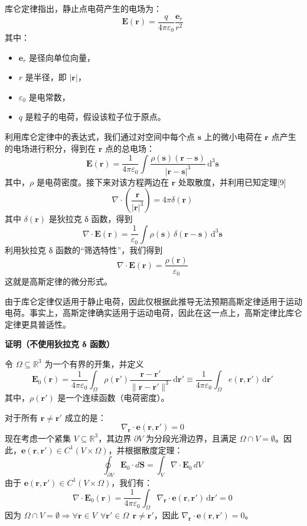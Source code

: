 库仑定律指出，静止点电荷产生的电场为：
\[
\mathbf{E} (\mathbf{r}) = \frac{q}{4 \pi \varepsilon_0} \frac{\mathbf{e}_r}{r^2}~
\]
其中：
\begin{itemize}
\item \(\mathbf{e}_r\) 是径向单位向量，
\item \(r\) 是半径，即 \(|\mathbf{r}|\)，
\item \(\varepsilon_0\) 是电常数，
\item \(q\) 是粒子的电荷，假设该粒子位于原点。
\end{itemize}
利用库仑定律中的表达式，我们通过对空间中每个点 \( \mathbf{s} \) 上的微小电荷在 \( \mathbf{r} \) 点产生的电场进行积分，得到在 \( \mathbf{r} \) 点的总电场：
\[
\mathbf{E} (\mathbf{r}) = \frac{1}{4 \pi \varepsilon_0} \int \frac{\rho (\mathbf{s}) (\mathbf{r} - \mathbf{s})}{|\mathbf{r} - \mathbf{s}|^3} \, \mathrm{d}^3 \mathbf{s}~
\]
其中，\(\rho\) 是电荷密度。接下来对该方程两边在 \( \mathbf{r} \) 处取散度，并利用已知定理[9]
\[
\nabla \cdot \left( \frac{\mathbf{r}}{|\mathbf{r}|^3} \right) = 4 \pi \delta (\mathbf{r})~
\]
其中 \(\delta(\mathbf{r})\) 是狄拉克 δ 函数，得到
\[
\nabla \cdot \mathbf{E} (\mathbf{r}) = \frac{1}{\varepsilon_0} \int \rho (\mathbf{s}) \, \delta (\mathbf{r} - \mathbf{s}) \, \mathrm{d}^3 \mathbf{s}~
\]
利用狄拉克 δ 函数的“筛选特性”，我们得到
\[
\nabla \cdot \mathbf{E} (\mathbf{r}) = \frac{\rho (\mathbf{r})}{\varepsilon_0}~
\]
这就是高斯定律的微分形式。

由于库仑定律仅适用于静止电荷，因此仅根据此推导无法预期高斯定律适用于运动电荷。事实上，高斯定律确实适用于运动电荷，因此在这一点上，高斯定律比库仑定律更具普适性。

\textbf{证明（不使用狄拉克 δ 函数）}

令 \(\Omega \subseteq \mathbb{R}^3\) 为一个有界的开集，并定义
\[
\mathbf{E}_0(\mathbf{r}) = \frac{1}{4\pi \varepsilon_0} \int_{\Omega} \rho(\mathbf{r'}) \frac{\mathbf{r} - \mathbf{r'}}{\|\mathbf{r} - \mathbf{r'}\|^3} \, \mathrm{d} \mathbf{r'} \equiv \frac{1}{4\pi \varepsilon_0} \int_{\Omega} e(\mathbf{r}, \mathbf{r'}) \, \mathrm{d} \mathbf{r'}~
\]
其中，\(\rho(\mathbf{r'})\) 是一个连续函数（电荷密度）。

对于所有 \(\mathbf{r} \neq \mathbf{r'}\) 成立的是：
\[
\nabla_{\mathbf{r}} \cdot \mathbf{e}(\mathbf{r}, \mathbf{r'}) = 0~
\]
现在考虑一个紧集 \(V \subseteq \mathbb{R}^3\)，其边界 \(\partial V\) 为分段光滑边界，且满足 \(\Omega \cap V = \emptyset\)。因此，\(\mathbf{e}(\mathbf{r}, \mathbf{r'}) \in C^1(V \times \Omega)\)，并根据散度定理：
\[
\oint_{\partial V} \mathbf{E}_0 \cdot d\mathbf{S} = \int_V \nabla \cdot \mathbf{E}_0 \, dV~
\]
由于 \(\mathbf{e}(\mathbf{r}, \mathbf{r'}) \in C^1(V \times \Omega)\)，我们有：
\[
\nabla \cdot \mathbf{E}_0(\mathbf{r}) = \frac{1}{4 \pi \varepsilon_0} \int_{\Omega} \nabla_{\mathbf{r}} \cdot \mathbf{e}(\mathbf{r}, \mathbf{r'}) \, \mathrm{d} \mathbf{r'} = 0~
\]
因为 \(\Omega \cap V = \emptyset \Rightarrow \forall \mathbf{r} \in V \ \ \forall \mathbf{r'} \in \Omega \ \ \mathbf{r} \neq \mathbf{r'}\)，因此 \(\nabla_{\mathbf{r}} \cdot \mathbf{e}(\mathbf{r}, \mathbf{r'}) = 0\)。

